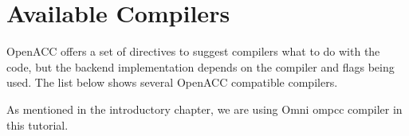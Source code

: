 \documentclass[ebook,10pt,oneside,openany]{memoir}
\begin{document}
\section{Available Compilers}
OpenACC offers a set of directives to suggest compilers what to do with the code, but the backend implementation depends on the compiler and flags being used. The list below shows several OpenACC compatible compilers.

\begin{table}[H]
\centering
{}
\caption{OpenACC compilers}
\label{my-label}
\end{table}

As mentioned in the introductory chapter, we are using Omni ompcc compiler in this tutorial.
\end{document}
